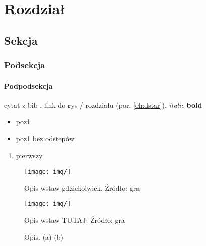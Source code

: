 
\chapter{Rozdział}
\label{ch:rozdzial}

\section{Sekcja}
\subsection{Podsekcja}
\subsubsection{Podpodsekcja}

\clearpage

cytat z bib \cite{siemiatkowska}.
link do rys / rozdziału (por. \ref{ch:dstar}).
{\it italic}
{\bf bold}

\begin{itemize}
	\item poz1
\end{itemize}

\vspace{-1em}
\begin{itemize}[noitemsep]
	\item poz1 bez odstepów
\end{itemize}

\begin{enumerate}
	\item pierwszy
\end{enumerate}

\begin{figure}
	\centering
	\texttt{[image: img/]}
	\caption{Opis-wstaw gdziekolwiek. Źródło: gra}
	\label{fig:img_}
\end{figure}

\begin{figure}[H]
	\centering
	\texttt{[image: img/]}
	\caption{Opis-wstaw TUTAJ. Źródło: gra}
	\label{fig:img_}
\end{figure}

\begin{figure}
	\centering
		\qquad
	\label{fig:img_}
	\caption{Opis.
	(a) 
	(b) }
\end{figure}

